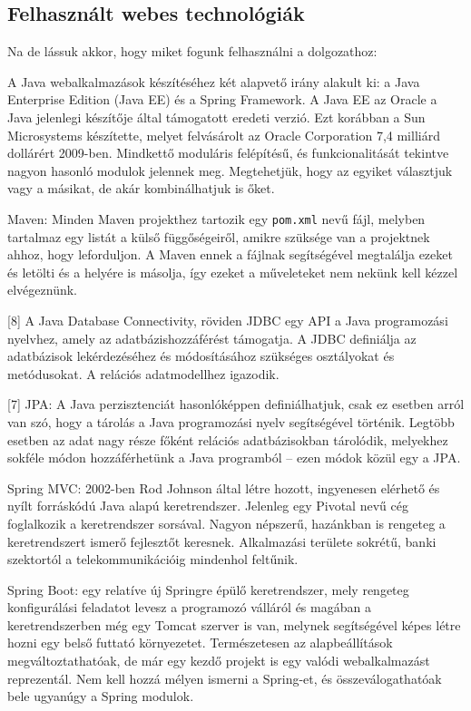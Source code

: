 \subsection{Felhasznált webes technológiák}

Na de lássuk akkor, hogy miket fogunk felhasználni a dolgozathoz: 

A Java webalkalmazások készítéséhez két alapvető irány alakult ki: a Java Enterprise Edition (Java EE) és a Spring Framework. A Java EE az Oracle a Java jelenlegi készítője által támogatott eredeti verzió. Ezt korábban a Sun Microsystems készítette, melyet felvásárolt az Oracle Corporation 7,4 milliárd dollárért 2009-ben. Mindkettő moduláris felépítésű, és funkcionalitását tekintve nagyon hasonló modulok jelennek meg. Megtehetjük, hogy az egyiket választjuk vagy a másikat, de akár kombinálhatjuk is őket.

Maven: Minden Maven projekthez tartozik egy \texttt{pom.xml} nevű fájl, melyben tartalmaz egy listát a külső függőségeiről, amikre szüksége van a projektnek ahhoz, hogy leforduljon. A Maven ennek a fájlnak segítségével megtalálja ezeket és letölti és a helyére is másolja, így ezeket a műveleteket nem nekünk kell kézzel elvégeznünk.

[8] A Java Database Connectivity, röviden JDBC egy API a Java programozási nyelvhez, amely az adatbázishozzáférést támogatja. A JDBC definiálja az adatbázisok lekérdezéséhez és módosításához szükséges osztályokat és metódusokat. A relációs adatmodellhez igazodik.

[7] JPA: A Java perzisztenciát hasonlóképpen definiálhatjuk, csak ez esetben arról van szó, hogy a tárolás a Java programozási nyelv segítségével történik. Legtöbb esetben az adat nagy része főként relációs adatbázisokban tárolódik, melyekhez sokféle módon hozzáférhetünk a Java programból – ezen módok közül egy a JPA.

Spring MVC: 2002-ben Rod Johnson által létre hozott, ingyenesen elérhető és nyílt forráskódú Java alapú keretrendszer. Jelenleg egy Pivotal nevű cég foglalkozik a keretrendszer sorsával. Nagyon népszerű, hazánkban is rengeteg a keretrendszert ismerő fejlesztőt keresnek. Alkalmazási területe sokrétű, banki szektortól a telekommunikációig mindenhol feltűnik.

Spring Boot: egy relatíve új Springre épülő keretrendszer, mely rengeteg konfigurálási feladatot levesz a programozó válláról és magában a keretrendszerben még egy Tomcat szerver is van, melynek segítségével képes létre hozni egy belső futtató környezetet. Természetesen az alapbeállítások megváltoztathatóak, de már egy kezdő projekt is egy valódi webalkalmazást reprezentál. Nem kell hozzá mélyen ismerni a Spring-et, és összeválogathatóak bele ugyanúgy a Spring modulok.

